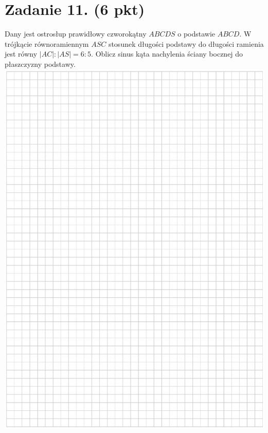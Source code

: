 \documentclass[10pt]{article}
\begin{document}
\section*{Zadanie 11. (6 pkt)}
Dany jest ostrosłup prawidłowy czworokątny \(A B C D S\) o podstawie \(A B C D\). W trójkącie równoramiennym \(A S C\) stosunek długości podstawy do długości ramienia jest równy \(|A C|:|A S|=6: 5\). Oblicz sinus kąta nachylenia ściany bocznej do płaszczyzny podstawy.\\
\includegraphics[max width=\textwidth, center]{2024_11_21_b36d8cbb94edb763da2cg-16}\\
\end{document}
